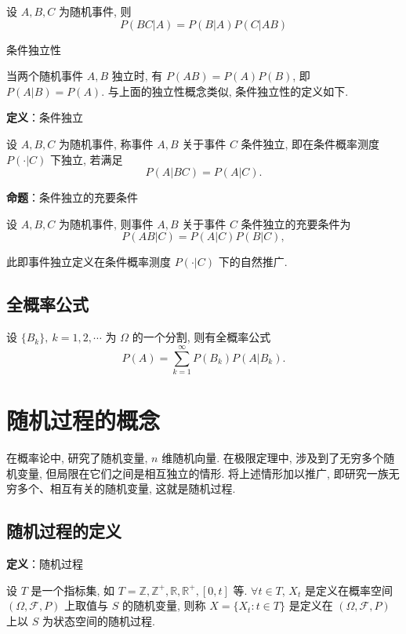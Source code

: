 \documentclass[openany]{ctexbook}
\theoremstyle{kaiti}
\theoremstyle{normal}
\begin{document}
设 $A,B,C$ 为随机事件, 则
\begin{equation}
  P(BC|A)=P(B|A)P(C|AB)
\end{equation}

条件独立性

当两个随机事件 $A,B$ 独立时, 有 $P(AB)=P(A)P(B)$, 即 $P(A|B)=P(A)$. 与上面的独立性概念类似, 条件独立性的定义如下. 

\textbf{定义}：条件独立

设 $A,B,C$ 为随机事件, 称事件 $A,B$ 关于事件 $C$ 条件独立, 即在条件概率测度 $P(\cdot|C)$ 下独立, 若满足 
\begin{equation}
  P(A|BC)=P(A|C).
\end{equation}

\textbf{命题}：条件独立的充要条件

设 $A,B,C$ 为随机事件, 则事件 $A,B$ 关于事件 $C$ 条件独立的充要条件为
\begin{equation}
  P(AB|C)=P(A|C)P(B|C),
\end{equation}

此即事件独立定义在条件概率测度 $P(\cdot|C)$ 下的自然推广.

\subsection{全概率公式}

设 $\{B_k\},~k=1,2,\cdots$ 为 $\Omega$ 的一个分割, 则有全概率公式
\begin{equation}
  P(A)=\sum_{k=1}^\infty P(B_k)P(A|B_k).
\end{equation}

\section{随机过程的概念}

在概率论中, 研究了随机变量, $n$ 维随机向量. 在极限定理中, 涉及到了无穷多个随机变量, 但局限在它们之间是相互独立的情形. 将上述情形加以推广, 即研究一族无穷多个、相互有关的随机变量, 这就是随机过程.

\subsection{随机过程的定义}

\textbf{定义}：随机过程

设 $T$ 是一个指标集, 如 $T=\mathbb{Z},\mathbb{Z}^+,\mathbb{R},\mathbb{R}^+,[0,t]$ 等. $\forall t\in T$, $X_t$ 是定义在概率空间 $(\Omega,\mathcal{F},P)$ 上取值与 $S$ 的随机变量, 则称 $X=\{X_t:t\in T\}$ 是定义在 $(\Omega,\mathcal{F},P)$ 上以 $S$ 为状态空间的随机过程.
\end{document}
